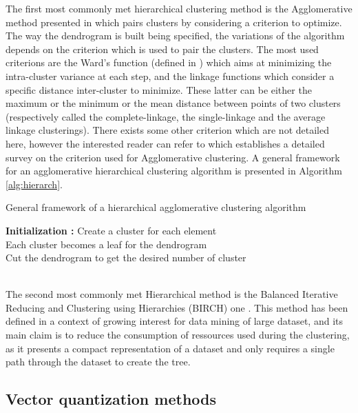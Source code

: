 \documentclass[a4paper]{report}
\begin{document}
    The first most commonly met hierarchical clustering method is the Agglomerative method presented in \cite{ward1963hierarchical} which pairs clusters by considering a criterion to optimize. The way the dendrogram is built being specified, the variations of the algorithm depends on the criterion which is used to pair the clusters. The most used criterions are the Ward's function (defined in \cite{ward1963hierarchical}) which aims at minimizing the intra-cluster variance at each step, and the linkage functions which consider a specific distance inter-cluster to minimize. These latter can be either the maximum or the minimum or the mean distance between points of two clusters (respectively called the complete-linkage, the single-linkage and the average linkage clusterings). There exists some other criterion which are not detailed here, however the interested reader can refer to \cite{murtagh1983survey} which establishes a detailed survey on the criterion used for Agglomerative clustering. A general framework for an agglomerative hierarchical clustering algorithm is presented in Algorithm \ref{alg:hierarch}.\\

    \begin{algorithm}[H]
        \caption{General framework of a hierarchical agglomerative clustering algorithm}
        \textbf{Initialization :} Create a cluster for each element\\
        Each cluster becomes a leaf for the dendrogram\\
        Cut the dendrogram to get the desired number of cluster
        \label{alg:hierarch}
    \end{algorithm}

    ~\\

    The second most commonly met Hierarchical method is the Balanced Iterative Reducing and Clustering using Hierarchies (BIRCH) one \cite{zhang1997birch}. This method has been defined in a context of growing interest for data mining of large dataset, and its main claim is to reduce the consumption of ressources used during the clustering, as it presents a compact representation of a dataset and only requires a single path through the dataset to create the tree.

    \subsection{Vector quantization methods}
    \label{sec:cluster_vector_quantization}
\end{document}
